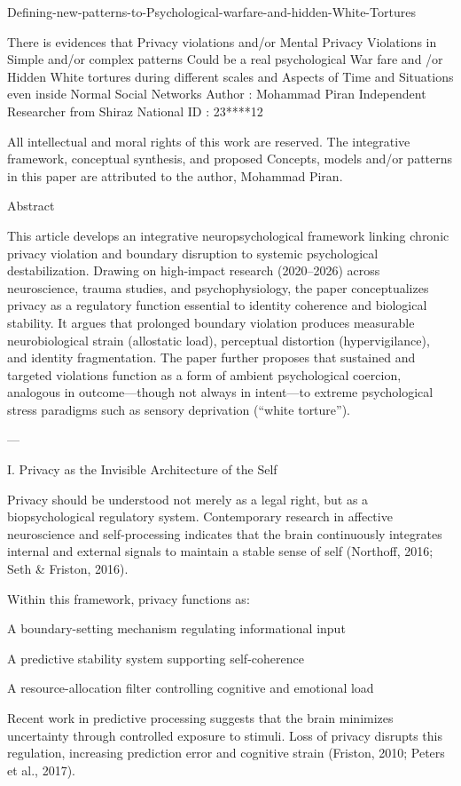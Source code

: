 Defining-new-patterns-to-Psychological-warfare-and-hidden-White-Tortures

There is evidences that Privacy violations and/or Mental Privacy Violations in Simple and/or complex patterns Could be a real psychological War fare and /or Hidden White tortures during different scales and Aspects of Time and Situations even inside Normal Social Networks 
Author : 
Mohammad Piran
Independent Researcher from Shiraz
National ID : 23****12

All intellectual and moral rights of this work are reserved. The integrative framework, conceptual synthesis, and proposed Concepts, models and/or patterns in this paper are attributed to the author, Mohammad Piran.

Abstract

This article develops an integrative neuropsychological framework linking chronic privacy violation and boundary disruption to systemic psychological destabilization. Drawing on high-impact research (2020–2026) across neuroscience, trauma studies, and psychophysiology, the paper conceptualizes privacy as a regulatory function essential to identity coherence and biological stability. It argues that prolonged boundary violation produces measurable neurobiological strain (allostatic load), perceptual distortion (hypervigilance), and identity fragmentation. The paper further proposes that sustained and targeted violations function as a form of ambient psychological coercion, analogous in outcome—though not always in intent—to extreme psychological stress paradigms such as sensory deprivation (“white torture”).


---

I. Privacy as the Invisible Architecture of the Self

Privacy should be understood not merely as a legal right, but as a biopsychological regulatory system. Contemporary research in affective neuroscience and self-processing indicates that the brain continuously integrates internal and external signals to maintain a stable sense of self (Northoff, 2016; Seth & Friston, 2016).

Within this framework, privacy functions as:

A boundary-setting mechanism regulating informational input

A predictive stability system supporting self-coherence

A resource-allocation filter controlling cognitive and emotional load


Recent work in predictive processing suggests that the brain minimizes uncertainty through controlled exposure to stimuli. Loss of privacy disrupts this regulation, increasing prediction error and cognitive strain (Friston, 2010; Peters et al., 2017).

